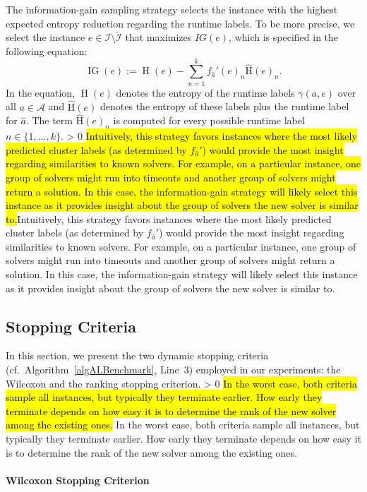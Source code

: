 \documentclass[sn-basic, Numbered]{sn-jnl} %
\newcommand{\showchanges}{1} %
\newcommand{\change}[1]{\ifnum \showchanges > 0 \sethlcolor{yellow}\hl{#1}\else#1\fi}
\begin{document}
The information-gain sampling strategy selects the instance with the highest expected entropy reduction regarding the runtime labels.
To be more precise, we select the instance $e \in \mathcal{I} \setminus \tilde{\mathcal{I}}$ that maximizes $IG(e)$, which is specified in the following equation:
%
\begin{equation*}
  \operatorname{IG}(e) := \operatorname{H}(e) - \sum_{n = 1}^{k} f_{\hat{a}}'(e)_{n} \operatorname{\hat H}(e)_n \text{.}
\end{equation*}
%
In the equation, $\operatorname{H}(e)$ denotes the entropy of the runtime labels $\gamma(a, e)$ over all $a \in \mathcal{A}$ and $\operatorname{\hat H}(e)$ denotes the entropy of these labels plus the runtime label for $\hat{a}$.
The term $\operatorname{\hat H}(e)_n$ is computed for every possible runtime label $n \in \{1, \dots, k\}$.
\change{Intuitively, this strategy favors instances where the most likely predicted cluster labels (as determined by $f_{\hat a}'$) would provide the most insight regarding similarities to known solvers.
For example, on a particular instance, one group of solvers might run into timeouts and another group of solvers might return a solution.
In this case, the information-gain strategy will likely select this instance as it provides insight about the group of solvers the new solver is similar to.}

\subsection{Stopping Criteria}
\label{sec:main:stopping}

In this section, we present the two dynamic stopping criteria (cf.~Algorithm~\ref{algALBenchmark}, Line~3) employed in our experiments: the Wilcoxon and the ranking stopping criterion.
\change{
In the worst case, both criteria sample all instances, but typically they terminate earlier.
How early they terminate depends on how easy it is to determine the rank of the new solver among the existing ones.
}

\paragraph{Wilcoxon Stopping Criterion}
\end{document}
